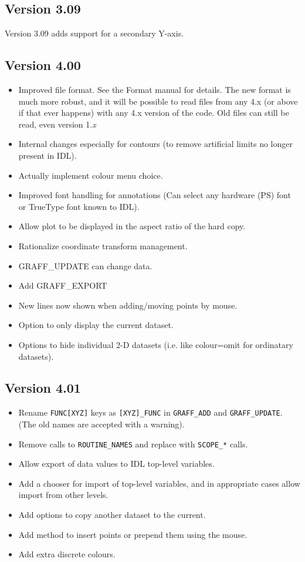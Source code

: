 \documentclass[11pt,twoside,english]{article}
\begin{document}
\subsection{Version 3.09}
\label{sec:v309}

Version 3.09 adds support for a secondary Y-axis.

\subsection{Version 4.00}
\label{sec:v400}

\begin{itemize}
\item Improved file format. See the Format manual for details. The new
  format is much more robust, and it will be possible to read files
  from any 4.x (or above if that ever happens) with any 4.x version of
  the code. Old files can still be read, even version 1.\textit{x}
\item Internal changes especially for contours (to remove artificial
  limits no longer present in IDL).
\item Actually implement colour menu choice.
\item Improved font handling for annotations (Can select any hardware
  (PS) font or TrueType font known to IDL).
\item Allow plot to be displayed in the aspect ratio of the hard copy.
\item Rationalize coordinate transform management.
\item GRAFF\_UPDATE can change data.
\item Add GRAFF\_EXPORT
\item New lines now shown when adding/moving points by mouse.
\item Option to only display the current dataset.
\item Options to hide individual 2-D datasets (i.e. like colour=omit
  for ordinatary datasets).
\end{itemize}

\subsection{Version 4.01}
\label{sec:v401}

\begin{itemize}
\item Rename \texttt{FUNC[XYZ]} keys as \texttt{[XYZ]\_FUNC} in
  \texttt{GRAFF\_ADD} and \texttt{GRAFF\_UPDATE}. (The old names are
  accepted with a warning).
\item Remove calls to \texttt{ROUTINE\_NAMES} and replace with
  \texttt{SCOPE\_*} calls.
\item Allow export of data values to IDL top-level variables.
\item Add a chooser for import of top-level variables, and in
  appropriate cases allow import from other levels.
\item Add options to copy another dataset to the current.
\item Add method to insert points or prepend them using the mouse.
\item Add extra discrete colours.
\end{itemize}
\end{document}
